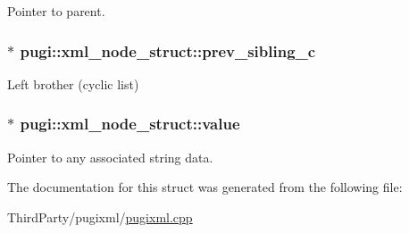 Pointer to parent. 

\hypertarget{structpugi_1_1xml__node__struct_a74e62128c88c422c0ed969633bbb2d4e}{
\subsubsection[{prev\-\_\-sibling\-\_\-c}]{$\ast$ pugi\-::xml\-\_\-node\-\_\-struct\-::prev\-\_\-sibling\-\_\-c}}\label{structpugi_1_1xml__node__struct_a74e62128c88c422c0ed969633bbb2d4e}


Left brother (cyclic list) 

\hypertarget{structpugi_1_1xml__node__struct_a191e708864fccda17bb66157afdadd2d}{
\subsubsection[{value}]{$\ast$ pugi\-::xml\-\_\-node\-\_\-struct\-::value}}\label{structpugi_1_1xml__node__struct_a191e708864fccda17bb66157afdadd2d}


Pointer to any associated string data. 



The documentation for this struct was generated from the following file\-:\begin{DoxyCompactItemize}
\item 
Third\-Party/pugixml/\hyperlink{pugixml_8cpp}{pugixml.\-cpp}\end{DoxyCompactItemize}

